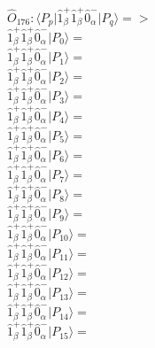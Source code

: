 \documentclass[14pt]{article}
\begin{document}
    $\hat{O}_{176}:  \langle{P_p}\vert \hat{1}_{\beta}^{+}\hat{1}_{\beta}^{+}\hat{0}_{\alpha}^{-} \vert{P_q}\rangle => $ \\ 
    $ \hat{1}_{\beta}^{+}\hat{1}_{\beta}^{+}\hat{0}_{\alpha}^{-} \vert{P_{0}}\rangle =  $ \\ 
    $ \hat{1}_{\beta}^{+}\hat{1}_{\beta}^{+}\hat{0}_{\alpha}^{-} \vert{P_{1}}\rangle =  $ \\ 
    $ \hat{1}_{\beta}^{+}\hat{1}_{\beta}^{+}\hat{0}_{\alpha}^{-} \vert{P_{2}}\rangle =  $ \\ 
    $ \hat{1}_{\beta}^{+}\hat{1}_{\beta}^{+}\hat{0}_{\alpha}^{-} \vert{P_{3}}\rangle =  $ \\ 
    $ \hat{1}_{\beta}^{+}\hat{1}_{\beta}^{+}\hat{0}_{\alpha}^{-} \vert{P_{4}}\rangle =  $ \\ 
    $ \hat{1}_{\beta}^{+}\hat{1}_{\beta}^{+}\hat{0}_{\alpha}^{-} \vert{P_{5}}\rangle =  $ \\ 
    $ \hat{1}_{\beta}^{+}\hat{1}_{\beta}^{+}\hat{0}_{\alpha}^{-} \vert{P_{6}}\rangle =  $ \\ 
    $ \hat{1}_{\beta}^{+}\hat{1}_{\beta}^{+}\hat{0}_{\alpha}^{-} \vert{P_{7}}\rangle =  $ \\ 
    $ \hat{1}_{\beta}^{+}\hat{1}_{\beta}^{+}\hat{0}_{\alpha}^{-} \vert{P_{8}}\rangle =  $ \\ 
    $ \hat{1}_{\beta}^{+}\hat{1}_{\beta}^{+}\hat{0}_{\alpha}^{-} \vert{P_{9}}\rangle =  $ \\ 
    $ \hat{1}_{\beta}^{+}\hat{1}_{\beta}^{+}\hat{0}_{\alpha}^{-} \vert{P_{10}}\rangle =  $ \\ 
    $ \hat{1}_{\beta}^{+}\hat{1}_{\beta}^{+}\hat{0}_{\alpha}^{-} \vert{P_{11}}\rangle =  $ \\ 
    $ \hat{1}_{\beta}^{+}\hat{1}_{\beta}^{+}\hat{0}_{\alpha}^{-} \vert{P_{12}}\rangle =  $ \\ 
    $ \hat{1}_{\beta}^{+}\hat{1}_{\beta}^{+}\hat{0}_{\alpha}^{-} \vert{P_{13}}\rangle =  $ \\ 
    $ \hat{1}_{\beta}^{+}\hat{1}_{\beta}^{+}\hat{0}_{\alpha}^{-} \vert{P_{14}}\rangle =  $ \\ 
    $ \hat{1}_{\beta}^{+}\hat{1}_{\beta}^{+}\hat{0}_{\alpha}^{-} \vert{P_{15}}\rangle =  $ \\ 
    
\end{document}

